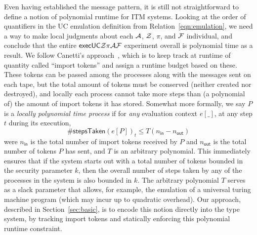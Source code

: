 Even having established the message pattern, it is still not straightforward to define a notion of polynomial runtime for ITM systems.
Looking at the order of quantifiers in the UC emulation definition from Relation~\ref{eqn:emulation}, we need a way to make local judgments about each $\mathcal{A}$, $\mathcal{Z}$, $\pi$, and $\mathcal{F}$ individual, and conclude that the entire ${\mathsf {execUC}} \mathcal{Z} \pi \mathcal{A} \mathcal{F}$ experiment overall is polynomial time as a result.
We follow Canetti's approach~\cite{canettiUC}, which is to keep track at runtime of quantity called ``import tokens'' and assign a runtime budget based on these.
These tokens can be passed among the processes along with the messages sent on each tape, but the total amount of tokens must be conserved (neither created nor destroyed), and locally each process cannot take more steps than (a polynomial of) the amount of import tokens it has stored.
Somewhat more formally, we say $P$ is a \emph{locally polynomial time process} if for \emph{any} evaluation context $e[\_]$, at any step $t$ during its execution,
\[
\#\textsf{stepsTaken}(e[P])_{t} \le T(n_{\textsf{in}} - n_{\textsf{out}})
\]
were $n_{\textsf{in}}$ is the total number of import tokens received by $P$ and $n_{\textsf{out}}$ is the total number of tokens $P$ has sent, and $T$ is an arbitrary polynomial.
This immediately ensures that if the system starts out with a total number of tokens bounded in the security parameter $k$, then the overall number of steps taken by any of the processes in the system is also bounded in $k$.
The arbitrary polynomial $T$ serves as a slack parameter that allows, for example, the emulation of a universal turing machine program (which may incur up to quadratic overhead).
Our approach, described in Section~\ref{sec:basic}, is to encode this notion directly into the type system, by tracking import tokens and statically enforcing this polynomial runtime constraint.


